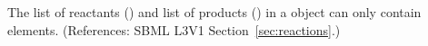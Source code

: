 The list of reactants (\ListOfReactants) and list of products
(\ListOfProducts) in a \Reaction object can only contain \SpeciesReference
elements.  (References: SBML L3V1 Section~\ref{sec:reactions}.)
